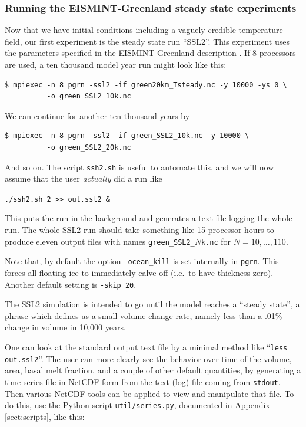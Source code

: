\documentclass[11pt,final]{amsart}
\begin{document}
\subsubsection*{Running the EISMINT-Greenland steady state experiments}  Now that we have initial conditions including a vaguely-credible temperature field, our first experiment is the steady state run ``SSL2''.  This experiment uses the parameters specified in the EISMINT-Greenland description \cite{RitzEISMINT}.  If 8 processors are used, a ten thousand model year run might look like this:

\begin{verbatim}
$ mpiexec -n 8 pgrn -ssl2 -if green20km_Tsteady.nc -y 10000 -ys 0 \
          -o green_SSL2_10k.nc
\end{verbatim}
\noindent We can continue for another ten thousand years by

\begin{verbatim}
$ mpiexec -n 8 pgrn -ssl2 -if green_SSL2_10k.nc -y 10000 \
          -o green_SSL2_20k.nc
\end{verbatim}
\noindent And so on.   The script \verb|ssh2.sh| is useful to automate this, and we will now assume that the user \emph{actually} did a run like  

\verb|./ssh2.sh 2 >> out.ssl2 &|

\noindent This puts the run in the background and generates a text file logging the whole run.  The whole SSL2 run should take something like 15 processor hours to produce eleven output files with names \verb|green_SSL2_|$N$\verb|k.nc| for $N=10,\dots,110$.

Note that, by default the option \verb|-ocean_kill| is set internally in \verb|pgrn|.  This forces all floating ice to immediately calve off (i.e.~to have thickness zero).  Another default setting is \verb|-skip 20|.

The SSL2 simulation is intended to go until the model reaches a ``steady state'', a phrase which \cite{RitzEISMINT} defines as a small volume change rate, namely less than a .01\% change in volume in 10,000 years.

One can look at the standard output text file by a minimal method like ``\verb|less out.ssl2|''.  The user can more clearly see the behavior over time of the volume, area, basal melt fraction, and a couple of other default quantities, by generating a time series file in NetCDF form from the text (log) file coming from \verb|stdout|.  Then various NetCDF tools can be applied to view and manipulate that file.  To do this, use the Python script \verb|util/series.py|, documented in Appendix \ref{sect:scripts}, like this:
\end{document}
